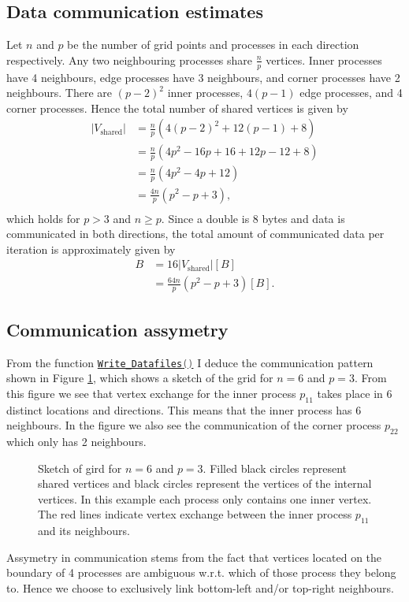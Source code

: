\subsection{Data communication estimates}
Let $n$ and $p$ be the number of grid points and processes in each direction respectively. 
Any two neighbouring processes share $\frac{n}{p}$ vertices. Inner processes have 4 neighbours,
edge processes have 3 neighbours, and corner processes have 2 neighbours. There are $(p-2)^2$ inner
processes, $4(p-1)$ edge processes, and 4 corner processes. Hence the total number of shared vertices
is given by
\begin{align*}
    |V_{\textrm{shared}}| &= \frac{n}{p}\left(4(p-2)^2 + 12(p-1) + 8\right)\\
    &= \frac{n}{p}\left(4p^2 - 16p + 16 + 12p - 12 + 8\right)\\
    &= \frac{n}{p}\left(4p^2 - 4p + 12\right)\\
    &= \frac{4n}{p}\left(p^2 - p + 3\right),\\
\label{eq:shared_vertices}
\end{align*}
which holds for $p>3$ and $n\geq p$. Since a double is $8$ bytes and data is communicated in both 
directions, the total amount of communicated data per iteration is approximately given by
\begin{align*}
    B &= 16 |V_{\textrm{shared}}| [B]\\
    &= \frac{64n}{p}\left(p^2 - p + 3\right) [B].
\end{align*}

\subsection{Communication assymetry}
\label{sec:communication_assymetry}
From the function 
\href{https://github.com/PhilipSoliman/hpc-labs/blob/96864119216b357345f2e0b75c3b423d411a9a99/assignment_2/GridDist.c#L309-L322}
{\lstinline[language=C]|Write_Datafiles()|}
I deduce the communication pattern shown in Figure \ref{fig:parallel_fem_ambiguity},
which shows a sketch of the grid for $n=6$ and $p=3$. From this figure we see
that vertex exchange for the inner process $p_{11}$ takes place in 6 distinct locations and directions. 
This means that the inner process has 6 neighbours. In the figure we also see the communication of the 
corner process $p_{22}$ which only has 2 neighbours. 
\begin{figure}[H]
    \centering
    
    \caption{Sketch of gird for $n=6$ and $p=3$. Filled black circles represent shared vertices and 
    black circles represent the vertices of the internal vertices. In this example each process
    only contains one inner vertex. The red lines indicate vertex exchange between the inner process $p_11$ and its
    neighbours.}
    \label{fig:parallel_fem_ambiguity}
\end{figure}
Assymetry in communication stems from the fact that vertices located on the boundary 
of 4 processes are ambiguous w.r.t. which of those process they belong to. Hence 
we choose to exclusively link bottom-left and/or top-right neighbours. 

